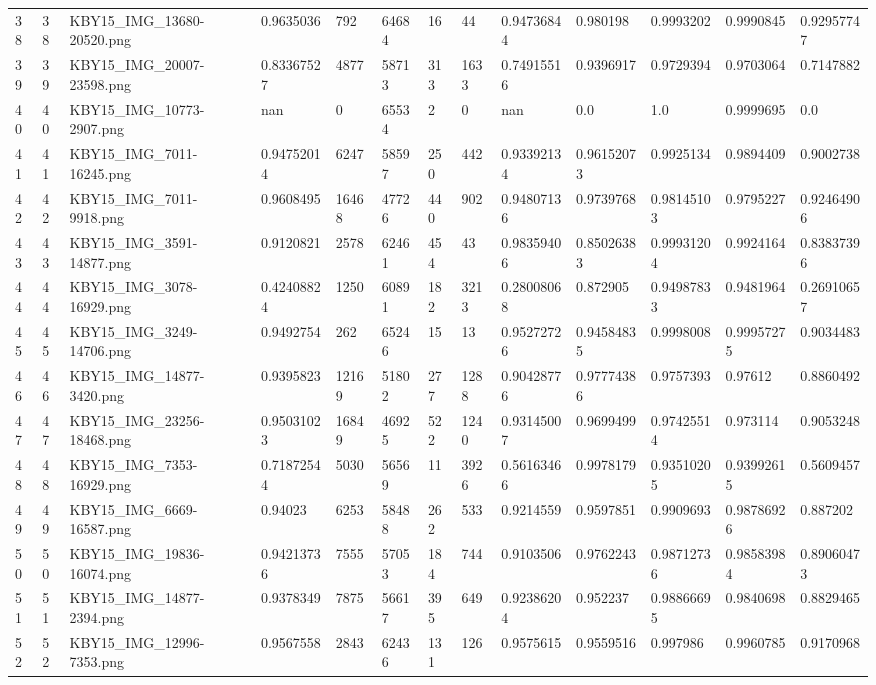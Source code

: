 \documentclass[11pt, a4paper, twoside]{report}
\begin{document}
\begin{longtable}[c]{@{}lllllllllllll@{}}
38 & 38 & KBY15\_IMG\_13680-20520.png & 0.9635036 & 792 & 64684 & 16 & 44 & 0.94736844 & 0.980198 & 0.9993202 & 0.9990845 & 0.92957747 \\
39 & 39 & KBY15\_IMG\_20007-23598.png & 0.83367527 & 4877 & 58713 & 313 & 1633 & 0.74915516 & 0.9396917 & 0.9729394 & 0.9703064 & 0.7147882 \\
40 & 40 & KBY15\_IMG\_10773-2907.png & nan & 0 & 65534 & 2 & 0 & nan & 0.0 & 1.0 & 0.9999695 & 0.0 \\
41 & 41 & KBY15\_IMG\_7011-16245.png & 0.94752014 & 6247 & 58597 & 250 & 442 & 0.93392134 & 0.96152073 & 0.9925134 & 0.9894409 & 0.9002738 \\
42 & 42 & KBY15\_IMG\_7011-9918.png & 0.9608495 & 16468 & 47726 & 440 & 902 & 0.94807136 & 0.9739768 & 0.98145103 & 0.9795227 & 0.92464906 \\
43 & 43 & KBY15\_IMG\_3591-14877.png & 0.9120821 & 2578 & 62461 & 454 & 43 & 0.98359406 & 0.85026383 & 0.99931204 & 0.9924164 & 0.83837396 \\
44 & 44 & KBY15\_IMG\_3078-16929.png & 0.42408824 & 1250 & 60891 & 182 & 3213 & 0.28008068 & 0.872905 & 0.94987833 & 0.9481964 & 0.26910657 \\
45 & 45 & KBY15\_IMG\_3249-14706.png & 0.9492754 & 262 & 65246 & 15 & 13 & 0.95272726 & 0.94584835 & 0.9998008 & 0.99957275 & 0.9034483 \\
46 & 46 & KBY15\_IMG\_14877-3420.png & 0.9395823 & 12169 & 51802 & 277 & 1288 & 0.90428776 & 0.97774386 & 0.9757393 & 0.97612 & 0.8860492 \\
47 & 47 & KBY15\_IMG\_23256-18468.png & 0.95031023 & 16849 & 46925 & 522 & 1240 & 0.93145007 & 0.9699499 & 0.97425514 & 0.973114 & 0.9053248 \\
48 & 48 & KBY15\_IMG\_7353-16929.png & 0.71872544 & 5030 & 56569 & 11 & 3926 & 0.56163466 & 0.9978179 & 0.93510205 & 0.93992615 & 0.5609457 \\
49 & 49 & KBY15\_IMG\_6669-16587.png & 0.94023 & 6253 & 58488 & 262 & 533 & 0.9214559 & 0.9597851 & 0.9909693 & 0.98786926 & 0.887202 \\
50 & 50 & KBY15\_IMG\_19836-16074.png & 0.94213736 & 7555 & 57053 & 184 & 744 & 0.9103506 & 0.9762243 & 0.98712736 & 0.98583984 & 0.89060473 \\
51 & 51 & KBY15\_IMG\_14877-2394.png & 0.9378349 & 7875 & 56617 & 395 & 649 & 0.92386204 & 0.952237 & 0.98866695 & 0.9840698 & 0.8829465 \\
52 & 52 & KBY15\_IMG\_12996-7353.png & 0.9567558 & 2843 & 62436 & 131 & 126 & 0.9575615 & 0.9559516 & 0.997986 & 0.9960785 & 0.9170968 \\

\end{longtable}
\end{document}
